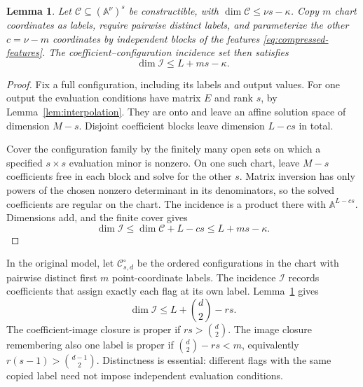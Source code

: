 \documentclass[11pt,a4paper]{article}
\newcommand{\A}{\mathbb A}
\newcommand{\Ccal}{\mathcal C}
\newcommand{\Ical}{\mathcal I}
\newtheorem{lemma}[theorem]{Lemma}
\theoremstyle{definition}
\theoremstyle{remark}
\numberwithin{equation}{section}
\begin{document}
\begin{lemma}\label{lem:universal-dimension}
Let $\Ccal\subseteq(\A^\nu)^s$ be constructible, with $\dim\Ccal\le\nu s-\kappa$. Copy $m$ chart coordinates as labels, require pairwise distinct labels, and parameterize the other $c=\nu-m$ coordinates by independent blocks of the features \eqref{eq:compressed-features}. The coefficient--configuration incidence set then satisfies
\begin{equation}\label{eq:universal-dimension}
\dim\Ical\le L+ms-\kappa.
\end{equation}
\end{lemma}

\begin{proof}
Fix a full configuration, including its labels and output values. For one output the evaluation conditions have matrix $E$ and rank $s$, by Lemma~\ref{lem:interpolation}. They are onto and leave an affine solution space of dimension $M-s$. Disjoint coefficient blocks leave dimension $L-cs$ in total.

Cover the configuration family by the finitely many open sets on which a specified $s\times s$ evaluation minor is nonzero. On one such chart, leave $M-s$ coefficients free in each block and solve for the other $s$. Matrix inversion has only powers of the chosen nonzero determinant in its denominators, so the solved coefficients are regular on the chart. The incidence is a product there with $\A^{L-cs}$. Dimensions add, and the finite cover gives
\[
\dim\Ical\le\dim\Ccal+L-cs\le L+ms-\kappa.
\]
\end{proof}

In the original model, let $\Ccal_{s,d}^{\circ}$ be the ordered configurations in the chart with pairwise distinct first $m$ point-coordinate labels. The incidence $\Ical$ records coefficients that assign exactly each flag at its own label. Lemma~\ref{lem:universal-dimension} gives
\begin{equation}\label{eq:original-dimension}
\dim\Ical\le L+\binom d2-rs.
\end{equation}
The coefficient-image closure is proper if $rs>\binom d2$. The image closure remembering also one label is proper if $\binom d2-rs<m$, equivalently $r(s-1)>\binom{d-1}2$. Distinctness is essential: different flags with the same copied label need not impose independent evaluation conditions.

\end{document}
